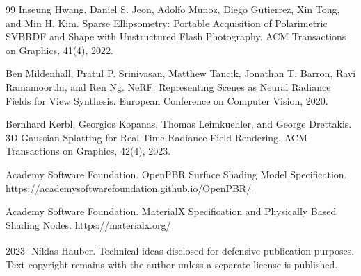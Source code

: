\documentclass[11pt, twoside, listof=totocnumbered, bibliography=totocnumbered]{scrartcl}
\begin{document}
\begin{thebibliography}{99}
		Inseung Hwang, Daniel S. Jeon, Adolfo Munoz, Diego Gutierrez, Xin Tong, and Min H. Kim.
		\newblock Sparse Ellipsometry: Portable Acquisition of Polarimetric SVBRDF and Shape with Unstructured Flash Photography.
		\newblock ACM Transactions on Graphics, 41(4), 2022.
		
		Ben Mildenhall, Pratul P. Srinivasan, Matthew Tancik, Jonathan T. Barron, Ravi Ramamoorthi, and Ren Ng.
		\newblock NeRF: Representing Scenes as Neural Radiance Fields for View Synthesis.
		\newblock European Conference on Computer Vision, 2020.
		
		Bernhard Kerbl, Georgios Kopanas, Thomas Leimkuehler, and George Drettakis.
		\newblock 3D Gaussian Splatting for Real-Time Radiance Field Rendering.
		\newblock ACM Transactions on Graphics, 42(4), 2023.
		
		Academy Software Foundation.
		\newblock OpenPBR Surface Shading Model Specification.
		\newblock \url{https://academysoftwarefoundation.github.io/OpenPBR/}
		
		Academy Software Foundation.
		\newblock MaterialX Specification and Physically Based Shading Nodes.
		\newblock \url{https://materialx.org/}
		
	\end{thebibliography}
	
	\vspace*{\fill}
	\textsuperscript{\textcopyright} 2023-\the\year{} Niklas Hauber. Technical ideas disclosed for defensive-publication purposes. Text copyright remains with the author unless a separate license is published.
\end{document}
